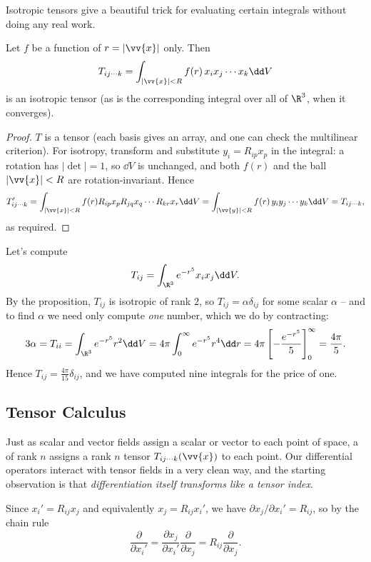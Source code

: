 Isotropic tensors give a beautiful trick for evaluating certain integrals without doing any real work.

\begin{proposition}
	Let $f$ be a function of $r = |\vv{x}|$ only. Then
	$$
	T_{ij \cdots k} = \int_{|\vv{x}| < R} f(r) \, x_i x_j \cdots x_k \dd V
	$$
	is an isotropic tensor (as is the corresponding integral over all of $\R^3$, when it converges).
\end{proposition}
\begin{proof}
	$T$ is a tensor (each basis gives an array, and one can check the multilinear criterion). For isotropy, transform and substitute $y_i = R_{ip}x_p$ in the integral: a rotation has $|\det| = 1$, so $\dd V$ is unchanged, and both $f(r)$ and the ball $|\vv{x}| < R$ are rotation-invariant. Hence
	$$
	T'_{ij\cdots k} = \int_{|\vv{x}| < R} f(r) R_{ip}x_p R_{jq}x_q \cdots R_{kr}x_r \dd V = \int_{|\vv{y}| < R} f(r) \, y_i y_j \cdots y_k \dd V = T_{ij \cdots k},
	$$
	as required.
\end{proof}

\begin{example}
	Let's compute
	$$
	T_{ij} = \int_{\R^3} e^{-r^5} x_i x_j \dd V.
	$$
	By the proposition, $T_{ij}$ is isotropic of rank $2$, so $T_{ij} = \alpha \delta_{ij}$ for some scalar $\alpha$ -- and to find $\alpha$ we need only compute \emph{one} number, which we do by contracting:
	$$
	3 \alpha = T_{ii} = \int_{\R^3} e^{-r^5} r^2 \dd V = 4\pi \int_0^\infty e^{-r^5} r^4 \dd r = 4 \pi \left[-\frac{e^{-r^5}}{5}\right]_0^\infty = \frac{4\pi}{5}.
	$$
	Hence $T_{ij} = \frac{4 \pi}{15}\delta_{ij}$, and we have computed nine integrals for the price of one.
\end{example}

\subsection{Tensor Calculus}

Just as scalar and vector fields assign a scalar or vector to each point of space, a  of rank $n$ assigns a rank $n$ tensor $T_{ij\cdots k}(\vv{x})$ to each point. Our differential operators interact with tensor fields in a very clean way, and the starting observation is that \emph{differentiation itself transforms like a tensor index}.

Since $x_i' = R_{ij}x_j$ and equivalently $x_j = R_{ij}x_i'$, we have $\partial x_j / \partial x_i' = R_{ij}$, so by the chain rule
$$
\frac{\partial}{\partial x_i'} = \frac{\partial x_j}{\partial x_i'} \frac{\partial}{\partial x_j} = R_{ij} \frac{\partial}{\partial x_j}.
$$

